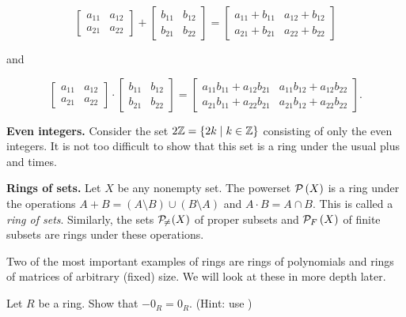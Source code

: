 \begin{examples}
\[\begin{bmatrix} a_{11} & a_{12} \\ a_{21} & a_{22} \end{bmatrix} + \begin{bmatrix} b_{11} & b_{12} \\ b_{21} & b_{22} \end{bmatrix} = \begin{bmatrix} a_{11} + b_{11} & a_{12} + b_{12} \\ a_{21} + b_{21} & a_{22} + b_{22} \end{bmatrix}\]

and

\[\begin{bmatrix} a_{11} & a_{12} \\ a_{21} & a_{22} \end{bmatrix} \cdot \begin{bmatrix} b_{11} & b_{12} \\ b_{21} & b_{22} \end{bmatrix} = \begin{bmatrix} a_{11}b_{11} + a_{12}b_{21} & a_{11}b_{12} + a_{12}b_{22} \\ a_{21}b_{11} + a_{22}b_{21} & a_{21}b_{12} + a_{22}b_{22} \end{bmatrix}.\]

\item \textbf{Even integers.} Consider the set \(2\mathbb{Z} = \{ 2k \mid k \in \mathbb{Z} \}\) consisting of only the even integers. It is not too difficult to show that this set is a ring under the usual plus and times.

\item \textbf{Rings of sets.} \label{examp:rings-of-sets}  Let \(X\) be any nonempty set. The powerset \(\mathcal{P}\left(X\right)\) is a ring under the operations \(A + B = (A \setminus B) \cup (B \setminus A)\) and \(A \cdot B = A \cap B\). This is called a \emph{ring of sets}. Similarly, the sets \(\mathcal{P}_{\!\neq\!}\left(X\right)\) of proper subsets and \(\mathcal{P}_F\left(X\right)\) of finite subsets are rings under these operations.
\end{examples}

Two of the most important examples of rings are rings of polynomials and rings of matrices of arbitrary (fixed) size. We will look at these in more depth later. 



\Exercises%

\begin{exercise}
Let \(R\) be a ring. Show that \(-0_R = 0_R\). (Hint: use )
\end{exercise}

